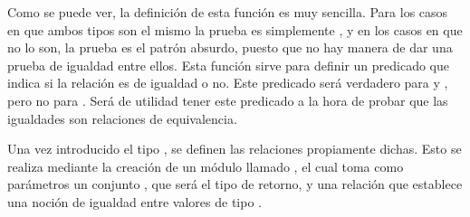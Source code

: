 
Como se puede ver, la definición de esta función es muy sencilla. Para los casos en que ambos tipos son el mismo la prueba es simplemente , y en los casos en que no lo son, la prueba es el patrón absurdo, puesto que no hay manera de dar una prueba de igualdad entre ellos. Esta función sirve para definir un predicado que indica si la relación es de igualdad o no. Este predicado será verdadero para  y , pero no para . Será de utilidad tener este predicado a la hora de probar que las igualdades son relaciones de equivalencia.


Una vez introducido el tipo , se definen las relaciones propiamente dichas. Esto se realiza mediante la creación de un módulo llamado , el cual toma como parámetros un conjunto  \AgdaSymbol{:} , que será el tipo de retorno, y una relación \AgdaBound{$\_\sim\_$} \AgdaSymbol{:}  \AgdaSymbol{$\rightarrow$}  \AgdaSymbol{$\rightarrow$}  que establece una noción de igualdad entre valores de tipo . 


